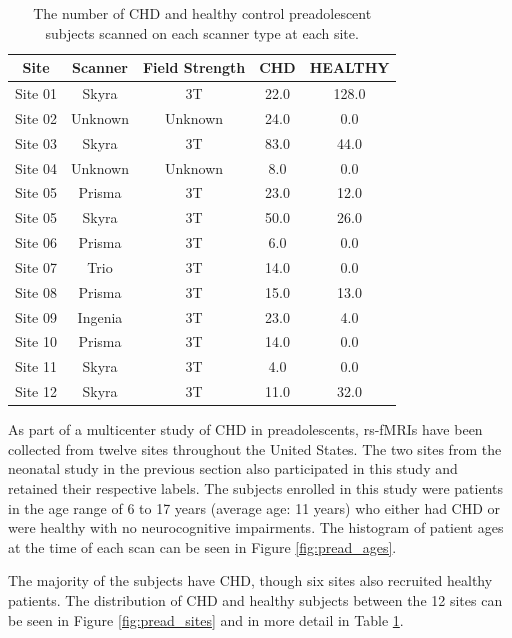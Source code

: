 \begin{table}[]
\centering
\caption{The number of CHD and healthy control preadolescent subjects scanned on each scanner type at each site.}
\label{tab:pread-site-counts}
\begin{tabular}{|c|c|c|c|c|}
\hline
\textbf{Site} & \textbf{Scanner} & \textbf{Field Strength} & \textbf{CHD} & \textbf{HEALTHY} \\ \hline
Site 01 & Skyra   & 3T & 22.0 & 128.0 \\ \hline
Site 02 & Unknown & Unknown & 24.0 & 0.0   \\ \hline
Site 03 & Skyra   & 3T & 83.0 & 44.0  \\ \hline
Site 04 & Unknown & Unknown  & 8.0  & 0.0   \\ \hline
Site 05 & Prisma  & 3T & 23.0 & 12.0  \\ \hline
Site 05 & Skyra   & 3T & 50.0 & 26.0  \\ \hline
Site 06 & Prisma  & 3T & 6.0  & 0.0   \\ \hline
Site 07 & Trio    & 3T & 14.0 & 0.0   \\ \hline
Site 08 & Prisma  & 3T & 15.0 & 13.0  \\ \hline
Site 09 & Ingenia & 3T & 23.0 & 4.0   \\ \hline
Site 10 & Prisma  & 3T & 14.0 & 0.0   \\ \hline
Site 11 & Skyra   & 3T & 4.0  & 0.0   \\ \hline
Site 12 & Skyra   & 3T & 11.0 & 32.0  \\ \hline
\end{tabular}
\end{table}

As part of a multicenter study of CHD in preadolescents, rs-fMRIs have been collected from twelve sites throughout the United States. The two sites from the neonatal study in the previous section also participated in this study and retained their respective labels. The subjects enrolled in this study were patients in the age range of 6 to 17 years (average age: 11 years) who either had CHD or were healthy with no neurocognitive impairments. The histogram of patient ages at the time of each scan can be seen in Figure \ref{fig:pread_ages}.

The majority of the subjects have CHD, though six sites also recruited healthy patients. The distribution of CHD and healthy subjects between the 12 sites can be seen in Figure \ref{fig:pread_sites} and in more detail in Table \ref{tab:pread-site-counts}.

